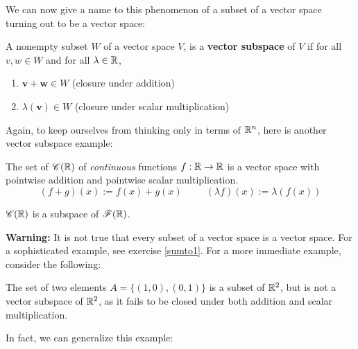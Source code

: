     We can now give a name to this phenomenon of a subset of a vector space turning out to be a vector space:
    
    \begin{definition}
    A nonempty subset $W$ of a vector space $V$, is a \textbf{vector subspace} of $V$ if for all $v, w \in W$ and for all $\lambda \in \mathbb{R}$, 
    
    \begin{enumerate}[label=(\roman*)]
        \item $\bm{v} + \bm{w} \in W$ (closure under addition)
        \item $\lambda (\bm{v}) \in W $ (closure under scalar multiplication)
    \end{enumerate}
    
    \end{definition}
    
    Again, to keep ourselves from thinking only in terms of $\mathbb{R}^n$, here is another vector subspace example:
    
    \begin{example}
    \vspace{-1em}
    \begin{theorem}\label{continuousfunctionsvspace}
    The set of $\mathscr{C}(\mathbb{R})$ of \textit{continuous} functions $f : \mathbb{R} \to \mathbb{R}$ is a vector space with pointwise addition and pointwise scalar multiplication.  $$(f + g)(x) := f(x) + g(x) \ \qquad \ (\lambda f)(x) := \lambda (f(x))$$
    \end{theorem}
    
    \begin{theorem}
    $\mathscr{C}(\mathbb{R})$ is a subspace of $\mathscr{F}(\mathbb{R})$.
    \end{theorem}
    
    \end{example}
    
    \textbf{Warning:} It is not true that every subset of a vector space is a vector space.  For a sophisticated example, see  exercise \ref{sumto1}.  For a more immediate example, consider the following:
    
    \begin{example}
    The set of two elements $A = \{(1,0), (0,1)\}$ is a subset of $\mathbb{R}^2$, but is not a vector subspace of $\mathbb{R}^2$, as it fails to be closed under both addition and scalar multiplication.
    \end{example}
    
    In fact, we can generalize this example:
    
